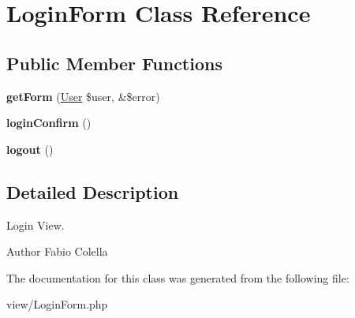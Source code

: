\hypertarget{classLoginForm}{\section{Login\+Form Class Reference}
\label{classLoginForm}
}
\subsection*{Public Member Functions}
\begin{DoxyCompactItemize}
\item 
\hypertarget{classLoginForm_af84f923c24f3be4056a7a0a752404191}{{\bfseries get\+Form} (\hyperlink{classUser}{User} \$user, \&\$error)}\label{classLoginForm_af84f923c24f3be4056a7a0a752404191}

\item 
\hypertarget{classLoginForm_a4e5b5e07892ff4a8f0f02a8fc6d94d12}{{\bfseries login\+Confirm} ()}\label{classLoginForm_a4e5b5e07892ff4a8f0f02a8fc6d94d12}

\item 
\hypertarget{classLoginForm_ae937bc750deebf50766a6fc7e0831a52}{{\bfseries logout} ()}\label{classLoginForm_ae937bc750deebf50766a6fc7e0831a52}

\end{DoxyCompactItemize}


\subsection{Detailed Description}
Login View.

\begin{DoxyAuthor}{Author}
Fabio Colella 
\end{DoxyAuthor}


The documentation for this class was generated from the following file\+:\begin{DoxyCompactItemize}
\item 
view/Login\+Form.\+php\end{DoxyCompactItemize}
